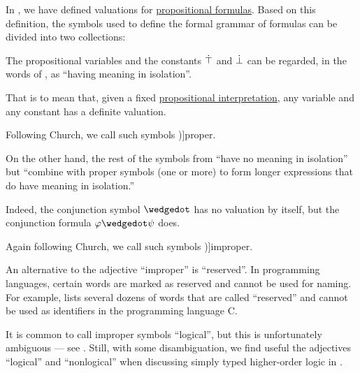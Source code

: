 \begin{concept}\label{con:improper_symbol}
  In , we have defined valuations for \hyperref[def:propositional_syntax/formula]{propositional formulas}. Based on this definition, the symbols used to define the formal grammar of formulas can be divided into two collections:
  \begin{thmenum}
     The propositional variables and the constants \( \dot{\top} \) and \( \dot{\bot} \) can be regarded, in the words of , as \enquote{having meaning in isolation}.

    That is to mean that, given a fixed \hyperref[def:propositional_valuation/interpretation]{propositional interpretation}, any variable and any constant has a definite valuation.

    Following Church, we call such symbols \term[en=proper (symbol) (\cite[32]{Church1956LogicVol1})]{proper}.

     On the other hand, the rest of the symbols from  \enquote{have no meaning in isolation} but \enquote{combine with proper symbols (one or more) to form longer expressions that do have meaning in isolation.}

    Indeed, the conjunction symbol \( {\synwedge} \) has no valuation by itself, but the conjunction formula \( \varphi \synwedge \psi \) does.

    Again following Church, we call such symbols \term[en=improper (symbol) (\cite[32]{Church1956LogicVol1})]{improper}.
  \end{thmenum}
\end{concept}
\begin{comments}
  \item An alternative to the adjective \enquote{improper} is \enquote{reserved}. In programming languages, certain words are marked as reserved and cannot be used for naming. For example, \cite[\S 6.4.1]{ISO:9899:2018} lists several dozens of words that are called \enquote{reserved} and cannot be used as identifiers in the programming language C.

  \item It is common to call improper symbols \enquote{logical}, but this is unfortunately ambiguous --- see . Still, with some disambiguation, we find useful the adjectives \enquote{logical} and \enquote{nonlogical} when discussing simply typed higher-order logic in .
\end{comments}

